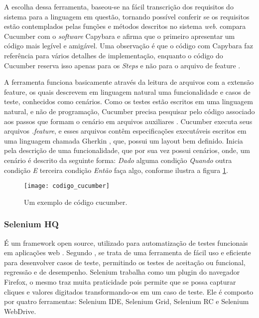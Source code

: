 \documentclass[12pt]{article}
\begin{document}
	A escolha dessa ferramenta, baseou-se na fácil transcrição dos requisitos do sistema para a linguagem em questão, tornando possível conferir se os requisitos estão contemplados pelas funções e métodos descritos no sistema \emph{web}. \citeauthor{lopescucumbervalor}\cite{lopescucumbervalor} compara Cucumber com o \emph{software} Capybara e afirma que o primeiro apresentar um código mais legível e amigável. Uma observação é que o código com Capybara faz referência para vários detalhes de implementação, enquanto o código do Cucumber reserva isso apenas para os \emph{Steps} e não para o arquivo de feature \cite{lopescucumbervalor}. 

	A ferramenta funciona basicamente através da leitura de arquivos com a extensão feature, os quais descrevem em linguagem natural uma funcionalidade e casos de teste, conhecidos como cenários.     
	Como os testes estão escritos em uma linguagem natural, e não de programação, Cucumber precisa pesquisar pelo código associado aos passos que formam o cenário em arquivos auxiliares \cite{scmitzcucumberreview}. Cucumber executa seus arquivos \emph{.feature}, e esses arquivos contêm especificações executáveis escritos em uma linguagem chamada Gherkin \cite{cucumberwiki}, que, possui um layout bem definido. Inicia pela descrição de uma funcionalidade, que por sua vez possui cenários, onde, um cenário é descrito da seguinte forma: \emph{Dado} alguma condição \emph{Quando} outra condição \emph{E} terceira condição \emph{Então} faça algo, conforme ilustra a figura \ref{fig:codigo_cucumber}.

	\begin{figure}[!htb]
		\centering
		\texttt{[image: codigo\_cucumber]}
		\caption{Um exemplo de código cucumber.}
		\label{fig:codigo_cucumber}
	\end{figure}

	\subsubsection{Selenium HQ}
	É um framework open source, utilizado para automatização de testes funcionais em aplicações web \cite{chiavegatto1desenvolvimento}. Segundo \citeauthor{pereiraestudoselenium} \cite{pereiraestudoselenium}, se trata
	de uma ferramenta de fácil uso e eficiente para desenvolver casos de teste, permitindo os testes de aceitação ou funcional, regressão e de desempenho.
	Selenium trabalha como um plugin do navegador Firefox, o mesmo traz muita praticidade pois permite que se possa capturar cliques e valores digitados transformando-os em um caso de teste. Ele é composto por
	quatro ferramentas: Selenium IDE, Selenium Grid, Selenium RC e Selenium WebDrive.
\end{document}
